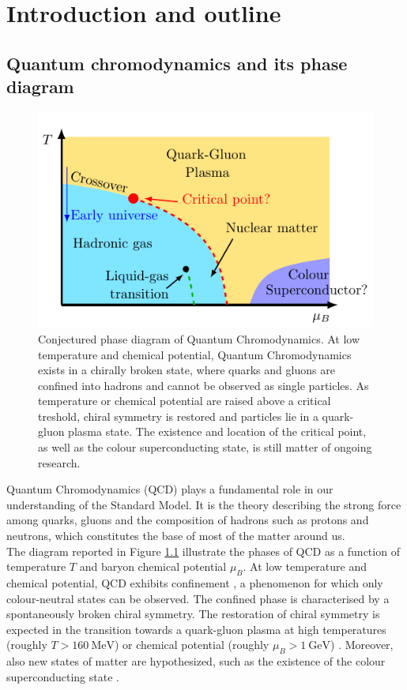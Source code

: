\chapter{Introduction and outline}
\label{chap:introduction}
\section{Quantum chromodynamics and its phase diagram}
\begin{figure}[h]
    \centering 
    \includegraphics[scale=1.3]{figures/phase_diagram.pdf}
    \caption[The phase diagram of QCD]{Conjectured phase diagram of Quantum Chromodynamics. At low temperature and chemical potential, Quantum Chromodynamics exists in a chirally broken state, where quarks and gluons are confined into hadrons and cannot be observed as single particles. As temperature or chemical potential are raised above a critical treshold, chiral symmetry is restored and particles lie in a quark-gluon plasma state. The existence and location of the critical point, as well as the colour superconducting state, is still matter of ongoing research.}
    \label{fig:QCD_phase_diagram}
\end{figure}
\noindent Quantum Chromodynamics (QCD) plays a fundamental role in our understanding of the Standard Model. It is the theory describing the strong force among quarks, gluons and the composition of hadrons such as protons and neutrons, which constitutes the base of most of the matter around us. \\
The diagram reported in Figure \ref{fig:QCD_phase_diagram} illustrate the phases of QCD as a function of temperature $T$ and baryon chemical potential $\mu_B$.
At low temperature and chemical potential, QCD exhibits confinement \cite{confinement_wilson,Greensite:2011zz}, a phenomenon for which only colour-neutral states can be observed. The confined phase is characterised by a spontaneously broken chiral symmetry. The restoration of chiral symmetry is expected in the transition towards a quark-gluon plasma at high temperatures (roughly $T > 160~\text{MeV}$) or chemical potential (roughly $\mu_B > 1~\text{GeV}$) \cite{Masayuki1989,Stephanov_1998,Berges_1999,doi:10.1142/S0217751X92001757,Endroedi_2014}. Moreover, also new states of matter are hypothesized, such as the existence of the colour superconducting state \cite{colorsuper1,colorsuper2,colorsuper3}. \\
